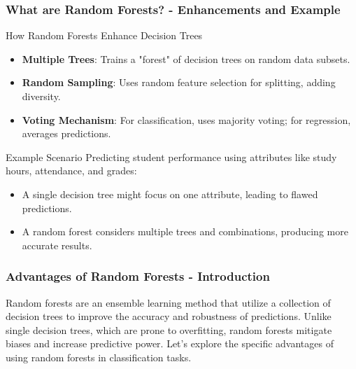 \documentclass[aspectratio=169]{beamer}
\begin{document}
\begin{frame}[fragile]
    \frametitle{What are Random Forests? - Enhancements and Example}
    \begin{block}{How Random Forests Enhance Decision Trees}
        \begin{itemize}
            \item \textbf{Multiple Trees}: Trains a "forest" of decision trees on random data subsets.
            \item \textbf{Random Sampling}: Uses random feature selection for splitting, adding diversity.
            \item \textbf{Voting Mechanism}: For classification, uses majority voting; for regression, averages predictions.
        \end{itemize}
    \end{block}
    
    \begin{block}{Example Scenario}
        Predicting student performance using attributes like study hours, attendance, and grades:
        \begin{itemize}
            \item A single decision tree might focus on one attribute, leading to flawed predictions.
            \item A random forest considers multiple trees and combinations, producing more accurate results.
        \end{itemize}
    \end{block}
\end{frame}

\begin{frame}[fragile]
    \frametitle{Advantages of Random Forests - Introduction}
    Random forests are an ensemble learning method that utilize a collection of decision trees to improve the accuracy and robustness of predictions. Unlike single decision trees, which are prone to overfitting, random forests mitigate biases and increase predictive power. Let’s explore the specific advantages of using random forests in classification tasks.
\end{frame}
\end{document}
